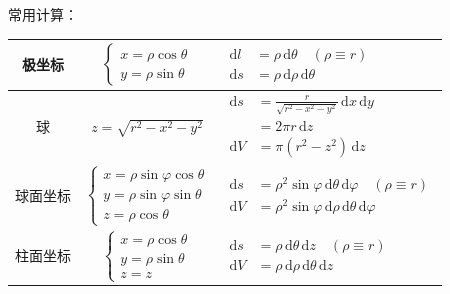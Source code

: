 \documentclass[12pt, a4paper, UTF8, openany]{ctexbook}
\newcommand{\dif}{\mathrm{d}}
\newcommand{\sdif}{\,\dif}
\begin{document}
        常用计算：
        \begin{longtable}[h]{c | c | w{c}{10cm}}
            极坐标 & $\begin{cases}
                x = \rho \cos\theta \\
                y = \rho \sin\theta
            \end{cases}$ & $\begin{aligned}
                \dif l &= \rho \sdif\theta \quad (\rho \equiv r) \\
                \dif s &= \rho \sdif\rho \sdif\theta
            \end{aligned}$ \\
            \midrule
            球 & $z = \sqrt{r^2 - x^2 - y^2}$ & $\begin{aligned}
                \dif s &= \frac{r}{\sqrt{r^2 - x^2 - y^2}} \sdif x \sdif y \\
                 &= 2 \pi r \sdif z \\
                \dif V &= \pi (r^2 - z^2) \sdif z 
            \end{aligned}$ \\
            \midrule
            球面坐标 & $\begin{cases}
                x = \rho \sin\varphi \cos\theta \\
                y = \rho \sin\varphi \sin\theta \\
                z = \rho \cos\theta
            \end{cases}$ & $\begin{aligned}
                \dif s &= \rho^2 \sin\varphi \sdif\theta \sdif\varphi \quad (\rho \equiv r) \\
                \dif V &= \rho^2 \sin\varphi \sdif\rho \sdif\theta \sdif\varphi
            \end{aligned}$ \\
            \midrule
            柱面坐标 & $\begin{cases}
                x = \rho \cos\theta \\
                y = \rho \sin\theta \\
                z = z
            \end{cases}$ & $\begin{aligned}
                \dif s &= \rho \sdif\theta \sdif z \quad (\rho \equiv r) \\
                \dif V &= \rho \sdif\rho \sdif\theta \sdif z
            \end{aligned}$
        \end{longtable}
\end{document}

